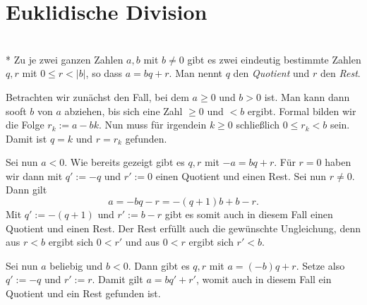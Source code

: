 \section{Euklidische Division}

\begin{Lemma}\mbox{}\\*
Zu je zwei ganzen Zahlen $a,b$ mit $b\ne 0$ gibt es zwei eindeutig
bestimmte Zahlen $q,r$ mit $0\le r<|b|$, so dass $a=bq+r$. Man nennt
$q$ den \emph{Quotient} und $r$ den \emph{Rest}.
\end{Lemma}
Betrachten wir zunächst den Fall, bei dem $a\ge 0$
und $b>0$ ist. Man kann dann sooft $b$ von $a$ abziehen, bis sich eine
Zahl $\ge 0$ und $<b$ ergibt. Formal bilden wir die
Folge $r_k := a-bk$. Nun muss für irgendein $k\ge 0$ schließlich
$0\le r_k<b$ sein. Damit ist $q=k$ und $r=r_k$ gefunden.

Sei nun $a<0$. Wie bereits gezeigt gibt es $q,r$ mit $-a = bq+r$.
Für $r=0$ haben wir dann mit $q':=-q$ und $r':=0$ einen Quotient
und einen Rest. Sei nun $r\ne 0$. Dann gilt
\[a = -bq-r = -(q+1)b + b - r.\]
Mit $q':=-(q+1)$ und $r':=b-r$ gibt es somit auch in diesem Fall einen
Quotient und einen Rest. Der Rest erfüllt auch die gewünschte
Ungleichung, denn aus $r<b$ ergibt sich $0<r'$ und aus $0<r$ ergibt
sich $r'<b$.

Sei nun $a$ beliebig und $b<0$. Dann gibt es $q,r$ mit $a=(-b)q+r$.
Setze also $q':=-q$ und $r':=r$. Damit gilt $a=bq'+r'$, womit
auch in diesem Fall ein Quotient und ein Rest gefunden ist.\,\qedsymbol


